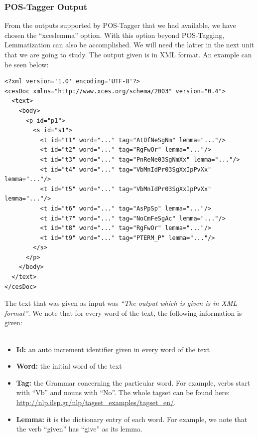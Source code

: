 \subsubsection{POS-Tagger Output}\label{3222_ref}
From the outputs supported by POS-Tagger that we had available, we have chosen the ``xceslemma'' option. With this option beyond POS-Tagging, Lemmatization can also be accomplished. We will need the latter in the next unit that we are going to study. The output given is in XML format. An example can be seen below:\\
\newpage
{}
\begin{lstlisting}[frame=single, basicstyle=\small]
<?xml version='1.0' encoding='UTF-8'?>
<cesDoc xmlns="http://www.xces.org/schema/2003" version="0.4">
  <text>
    <body>
      <p id="p1">
        <s id="s1">
          <t id="t1" word="..." tag="AtDfNeSgNm" lemma="..."/>
          <t id="t2" word="..." tag="RgFwOr" lemma="..."/>
          <t id="t3" word="..." tag="PnReNe03SgNmXx" lemma="..."/>
          <t id="t4" word="..." tag="VbMnIdPr03SgXxIpPvXx" lemma="..."/>
          <t id="t5" word="..." tag="VbMnIdPr03SgXxIpPvXx" lemma="..."/>
          <t id="t6" word="..." tag="AsPpSp" lemma="..."/>
          <t id="t7" word="..." tag="NoCmFeSgAc" lemma="..."/>
          <t id="t8" word="..." tag="RgFwOr" lemma="..."/>
          <t id="t9" word="..." tag="PTERM_P" lemma="..."/>
        </s>
      </p>
    </body>
  </text>
</cesDoc>
\end{lstlisting}
The text that was given as input was \textit{``The output which is given is in XML format''}. We note that for every word of the text, the following information is given:\\
\\
\begin{itemize}
	
	\item \textbf{Id:} an auto increment identifier given in every word of the text
	\item \textbf{Word:} the initial word of the text
	\item \textbf{Tag:} the Grammar concerning the particular word. For example, verbs start with ``Vb'' and nouns with ``No''. The whole tagset can be found here:\\ \url{http://nlp.ilsp.gr/nlp/tagset_examples/tagset_en/}.
	\item \textbf{Lemma:} it is the dictionary entry of each word. For example, we note that the verb ``given'' has ``give'' as its lemma.\\

\end{itemize}

